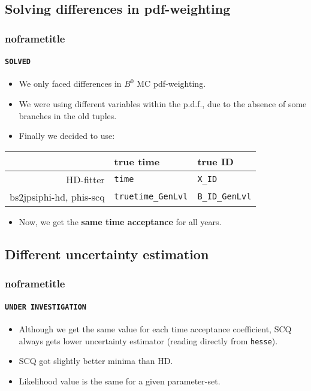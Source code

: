 \documentclass[aspectratio=43]{beamer}
\begin{document}
\subsection{Solving differences in pdf-weighting}
\begin{frame}[default]
\frametitle{noframetitle}
\framesubtitle{ \texttt{\color{scqgreen}SOLVED} }

\begin{itemize}
  \item We only faced differences in $B^0$ MC pdf-weighting.
  \item We were using different variables within the p.d.f., due to the absence of some branches in the old tuples.
  \item Finally we decided to use:
\end{itemize}
\begin{center}
  \begin{tabular}{r|ll}
                           & true time & true ID\\ \hline
  HD-fitter                & \texttt{time} & \texttt{X\_ID}\\
  bs2jpsiphi-hd, phis-scq  & \texttt{truetime\_GenLvl} & \texttt{B\_ID\_GenLvl}
  \end{tabular}
\end{center}

\begin{itemize}
  \item Now, we get the \textbf{same time acceptance} for all years.
\end{itemize}

\end{frame}



\subsection{Different uncertainty estimation}
\begin{frame}[default]
\frametitle{noframetitle}
\framesubtitle{ \texttt{\color{scqred}UNDER INVESTIGATION} }

\begin{itemize}
  \item Although we get the same value for each time acceptance coefficient, SCQ always gets lower uncertainty estimator (reading directly from \texttt{hesse}).
  \item SCQ got slightly better minima than HD.
  \item Likelihood value is the same for a given parameter-set.
\end{itemize}


\end{frame}
\end{document}
